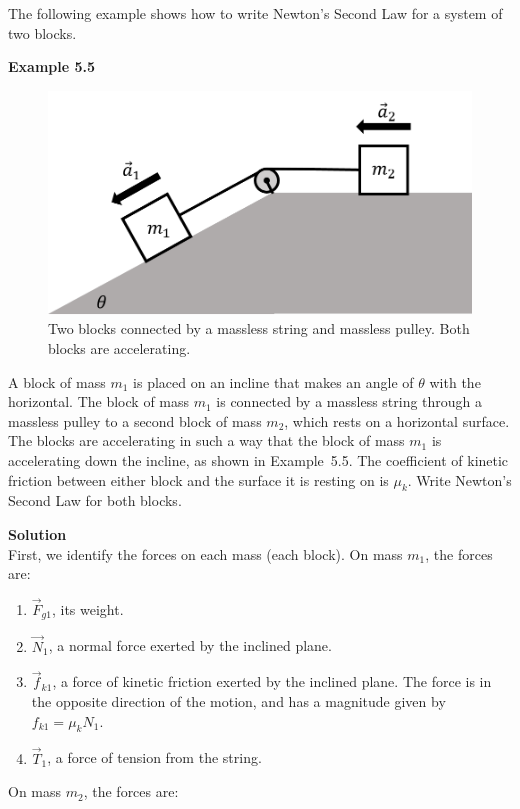 The following example shows how to write Newton's Second Law for a system of two blocks.

\begin{framed}
\textbf{Example 5.5}\\
\begin{figure}[!htbp]
\centering
\includegraphics[width=0.6\linewidth]{files/2blocksHI-c8b3543b2031065c3e6b1ad099f2a512.png}
\caption[]{Two blocks connected by a massless string and massless pulley. Both blocks are accelerating.}
\label{fig:newtonslaws:2blocksHI}
\end{figure}

A block of mass $m_1$ is placed on an incline that makes an angle of $\theta$ with the horizontal. The block of mass $m_1$ is connected by a massless string through a massless pulley to a second block of mass $m_2$, which rests on a horizontal surface. The blocks are accelerating in such a way that the block of mass $m_1$ is accelerating down the incline, as shown in Example~5.5. The coefficient of kinetic friction between either block and the surface it is resting on is $\mu_k$. Write Newton's Second Law for both blocks.

\begin{framed}
\textbf{Solution}\\
First, we identify the forces on each mass (each block). On mass $m_1$, the forces are:

\begin{enumerate}
\item $\vec F_{g1}$, its weight.
\item $\vec N_1$, a normal force exerted by the inclined plane.
\item $\vec f_{k1}$, a force of kinetic friction exerted by the inclined plane. The force is in the opposite direction of the motion, and has a magnitude given by $f_{k1}=\mu_kN_1$.
\item $\vec T_1$, a force of tension from the string.
\end{enumerate}

On mass $m_2$, the forces are:


\end{framed}
\end{framed}
